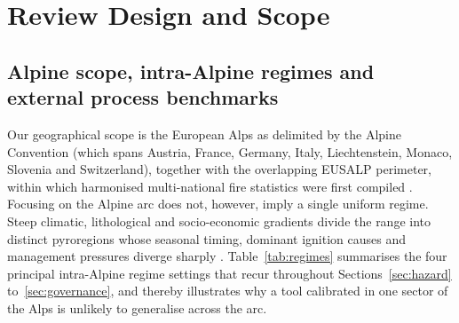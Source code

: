 \documentclass[11pt,a4paper]{article}
\begin{document}
\section{Review Design and Scope}
\label{sec:scope}

\subsection{Alpine scope, intra-Alpine regimes and external process benchmarks}

Our geographical scope is the European Alps as delimited by the Alpine Convention (which spans Austria, France, Germany, Italy, Liechtenstein, Monaco, Slovenia and Switzerland), together with the overlapping EUSALP perimeter, within which harmonised multi-national fire statistics were first compiled \citep{valese_wildfires_2011, muller_forest_2020}. Focusing on the Alpine arc does not, however, imply a single uniform regime. Steep climatic, lithological and socio-economic gradients divide the range into distinct pyroregions whose seasonal timing, dominant ignition causes and management pressures diverge sharply \citep{conedera_characterizing_2018, wastl_recent_2012, muller_forest_2020}. Table~\ref{tab:regimes} summarises the four principal intra-Alpine regime settings that recur throughout Sections~\ref{sec:hazard} to~\ref{sec:governance}, and thereby illustrates why a tool calibrated in one sector of the Alps is unlikely to generalise across the arc.
\end{document}
